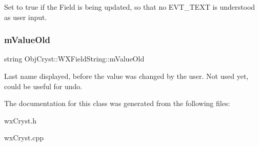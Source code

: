 Set to true if the Field is being updated, so that no \textquotesingle{}E\+V\+T\+\_\+\+T\+E\+XT\textquotesingle{} is understood as user input. \mbox{\label{class_obj_cryst_1_1_w_x_field_string_a3764d3f904c5e3709be04a97cc0a1e2b}} 
\subsubsection{\texorpdfstring{mValueOld}{mValueOld}}
{\footnotesize\ttfamily string Obj\+Cryst\+::\+W\+X\+Field\+String\+::m\+Value\+Old\hspace{0.3cm}{\ttfamily [protected]}}

Last name displayed, before the value was changed by the user. Not used yet, could be useful for undo. 

The documentation for this class was generated from the following files\+:\begin{DoxyCompactItemize}
\item 
wx\+Cryst.\+h\item 
wx\+Cryst.\+cpp\end{DoxyCompactItemize}
